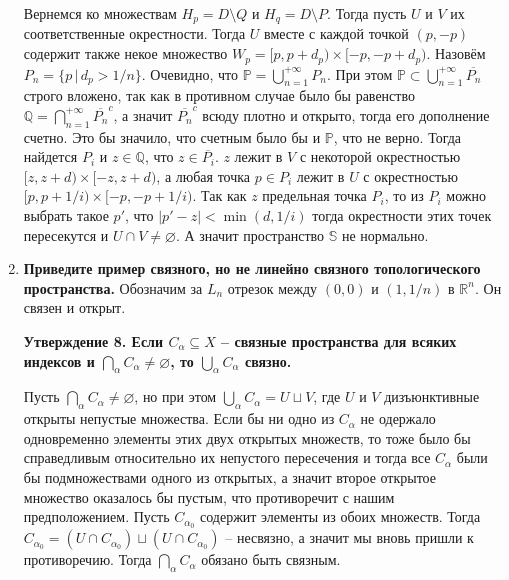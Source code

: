 \documentclass{article}
\begin{document}
\begin{enumerate}
        Вернемся ко множествам $H_p=D\setminus Q$ и $H_q=D\setminus P$. Тогда
        пусть $U$ и $V$ их соответственные окрестности. Тогда $U$ вместе с
        каждой точкой $(p,-p)$ содержит также некое множество $W_p=[p,p+d_p)
        \times[-p,-p+d_p)$. Назовём $P_n=\{p\,|\,d_p > 1/n\}$. Очевидно, что
        $\mathbb{P}=\bigcup_{n=1}^{+\infty}P_n$. При этом $\mathbb{P}\subset
        \bigcup_{n=1}^{+\infty}\overline{P_n}$ строго вложено, так как в
        противном случае было бы равенство $\mathbb{Q}=\bigcap_{n=1}^{+\infty}
        \overline{P_n}^c$, а значит $\overline{P_n}^c$ всюду плотно и открыто,
        тогда его дополнение счетно. Это бы значило, что счетным было бы и
        $\mathbb{P}$, что не верно. Тогда найдется $P_i$ и $z\in\mathbb{Q}$,
        что $z\in\overline{P_i}$. $z$ лежит в $V$ с некоторой окрестностью
        $[z,z+d)\times[-z,z+d)$, а любая точка $p\in P_i$ лежит в $U$ с
        окрестностью $[p,p+1/i)\times[-p,-p+1/i)$. Так как $z$ предельная точка
        $P_i$, то из $P_i$ можно выбрать такое $p'$, что $|p'-z|<\min(d,1/i)$
        тогда окрестности этих точек пересекутся и $U\cap V\neq\varnothing$. А
        значит пространство $\mathbb{S}$ не нормально.

    \item \textbf{Приведите пример связного, но не линейно связного
        топологического пространства.}
        Обозначим за $L_n$ отрезок между $(0,0)$ и $(1,1/n)$ в $\mathbb{R}^n$. Он
        связен и открыт.\par

        \textbf{Утверждение 8. Если $C_\alpha\subseteq X$ – связные пространства
        для всяких индексов и $\bigcap_\alpha C_\alpha\neq\varnothing$, то
        $\bigcup_\alpha C_\alpha$ связно.}\par

        Пусть $\bigcap_\alpha C_\alpha\neq\varnothing$, но при этом $\bigcup_\alpha
        C_\alpha=U\sqcup V$, где $U$ и $V$ дизъюнктивные открыты непустые множества.
        Если бы ни одно из $C_\alpha$ не одержало одновременно элементы этих двух
        открытых множеств, то тоже было бы справедливым относительно их непустого
        пересечения и тогда все $C_\alpha$ были бы подмножествами одного из
        открытых, а значит второе открытое множество оказалось бы пустым, что
        противоречит с нашим предположением. Пусть $C_{\alpha_0}$ содержит элементы
        из обоих множеств. Тогда $C_{\alpha_0}=(U\cap C_{\alpha_0})\sqcup (U\cap C_
        {\alpha_0})$ – несвязно, а значит мы вновь пришли к противоречию. Тогда
        $\bigcap_\alpha C_\alpha$ обязано быть связным.


\end{enumerate}
\end{document}
